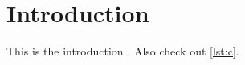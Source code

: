 \chapter{Introduction}\label{chp:introduction}

This is the introduction \cite{latex2e}.
Also check out \autoref{lst:c}.


